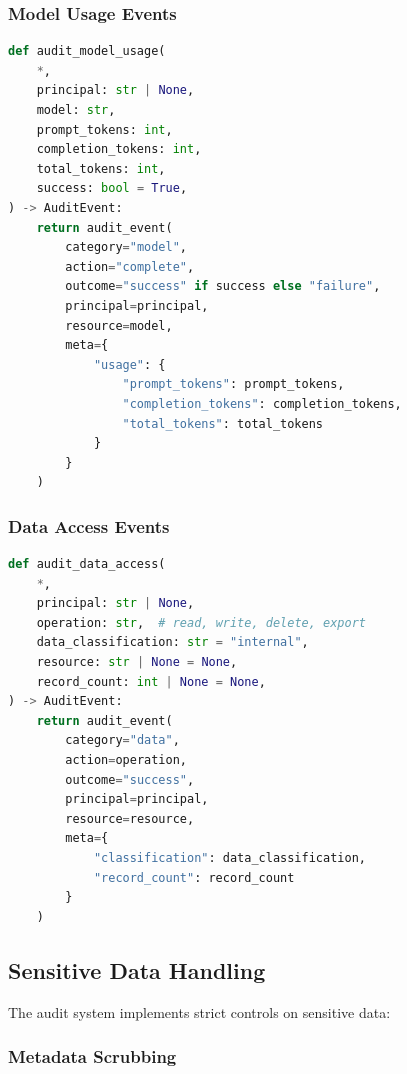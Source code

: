 \subsubsection{Model Usage Events}

\begin{lstlisting}[language=Python,caption={Model usage audit helper}]
def audit_model_usage(
    *,
    principal: str | None,
    model: str,
    prompt_tokens: int,
    completion_tokens: int,
    total_tokens: int,
    success: bool = True,
) -> AuditEvent:
    return audit_event(
        category="model",
        action="complete",
        outcome="success" if success else "failure",
        principal=principal,
        resource=model,
        meta={
            "usage": {
                "prompt_tokens": prompt_tokens,
                "completion_tokens": completion_tokens,
                "total_tokens": total_tokens
            }
        }
    )
\end{lstlisting}

\subsubsection{Data Access Events}

\begin{lstlisting}[language=Python,caption={Data access audit helper}]
def audit_data_access(
    *,
    principal: str | None,
    operation: str,  # read, write, delete, export
    data_classification: str = "internal",
    resource: str | None = None,
    record_count: int | None = None,
) -> AuditEvent:
    return audit_event(
        category="data",
        action=operation,
        outcome="success",
        principal=principal,
        resource=resource,
        meta={
            "classification": data_classification, 
            "record_count": record_count
        }
    )
\end{lstlisting}

\subsection{Sensitive Data Handling}
\label{subsec:audit-data-handling}

The audit system implements strict controls on sensitive data:

\subsubsection{Metadata Scrubbing}


